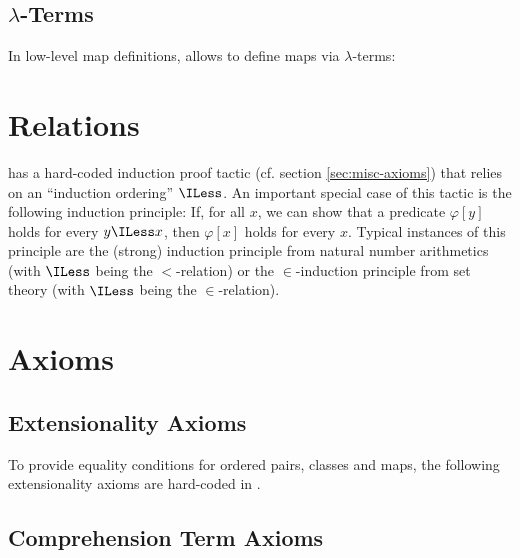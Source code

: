 \documentclass{stex}
\begin{document}
\subsection{$\lambda$-Terms}\label{sec:lambda-terms}

In low-level map definitions, \ForTheL allows to define maps via
$\lambda$-terms:



\section{Relations}\label{sec:relations}


\Naproche has a hard-coded induction proof tactic (cf. section
\ref{sec:misc-axioms}) that relies on an ``induction ordering'' $\ILess$.
An important special case of this tactic is the following induction principle:
If, for all $x$, we can show that a predicate $\varphi[y]$ holds for every
$y \ILess x$, then $\varphi[x]$ holds for every $x$.
Typical instances of this principle are the (strong) induction principle from
natural number arithmetics (with $\ILess$ being the $<$-relation) or the
$\in$-induction principle from set theory (with $\ILess$ being the
$\in$-relation).



\section{Axioms}\label{sec:axioms}

\subsection{Extensionality Axioms}\label{sec:extensionality-axioms}

To provide equality conditions for ordered pairs, classes and maps, the
following extensionality axioms are hard-coded in \Naproche.



\subsection{Comprehension Term Axioms}\label{sec:comprehension-term-axioms}
\end{document}
